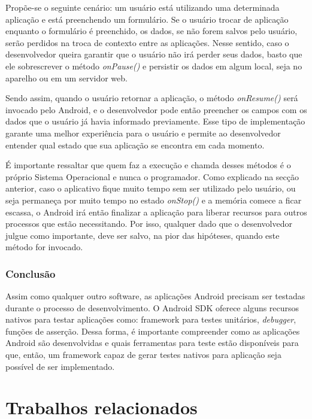 \documentclass[
    12pt,       %
    openright,      %
    twoside,      %
    a4paper,      %
    english,      %
    french,       %
    spanish,      %
    brazil,       %
    ]{abntex2}
\begin{document}
        Propõe-se o seguinte cenário: um usuário está utilizando uma determinada aplicação
        e está preenchendo um formulário. Se o usuário trocar de aplicação enquanto o formulário é
        preenchido, os dados, se não forem salvos pelo usuário, serão perdidos na troca de contexto
        entre as aplicações. Nesse sentido, caso o desenvolvedor queira garantir que o usuário não
        irá perder seus dados, basto que ele sobrescrever o método \textit{onPause()} e persistir
        os dados em algum local, seja no aparelho ou em um servidor web.

        Sendo assim, quando o usuário retornar a aplicação, o método \textit{onResume()} será invocado
        pelo Android, e o desenvolvedor pode então preencher os campos com os dados que o usuário
        já havia informado previamente. Esse tipo de implementação garante uma melhor experiência para
        o usuário e permite ao desenvolvedor entender qual estado que sua aplicação se encontra em cada
        momento.

        É importante ressaltar que quem faz a execução e chamda desses métodos é o próprio Sistema
        Operacional e nunca o programador. Como explicado na secção anterior, caso o aplicativo
        fique muito tempo sem ser utilizado pelo usuário, ou seja permaneça por muito tempo no
        estado \textit{onStop()} e a memória comece a ficar escassa, o Android irá então finalizar
        a aplicação para liberar recursos para outros processos que estão necessitando. Por
        isso, qualquer dado que o desenvolvedor julgue como importante, deve ser salvo, na pior das
        hipóteses, quando este método for invocado.

      \section{Conclusão}
        Assim como qualquer outro software, as aplicações Android precisam ser testadas durante o
        processo de desenvolvimento. O Android SDK oferece alguns recursos nativos para testar aplicações
        como: framework para testes unitários, \textit{debugger}, funções de asserção. Dessa forma, é
        importante compreender como as aplicações Android são desenvolvidas e quais ferramentas para teste
        estão disponíveis para que, então, um framework capaz de gerar testes nativos para aplicação seja
        possível de ser implementado.

  \part{Trabalhos relacionados}
\end{document}
